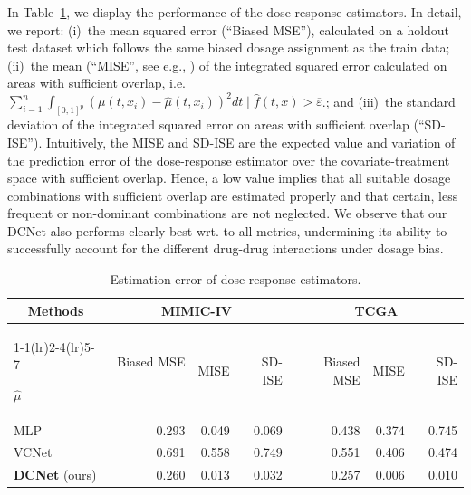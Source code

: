 In Table~\ref{tab:DRest}, we display the performance of the dose-response estimators. In detail, we report: (i)~the mean squared error (``Biased MSE''), calculated on a holdout test dataset which follows the same biased dosage assignment as the train data; (ii)~the mean (``MISE'', see e.g., \cite{Schwab.2020}) of the integrated squared error calculated on areas with sufficient overlap, i.e. $\sum_{i=1}^n\int_{[0, 1]^p}(\mu(t, x_i)-\hat{\mu}(t, x_i))^2dt \; | \; \hat{f}(t, x)>\overline{\varepsilon}$.; and (iii)~the standard deviation of the integrated squared error on areas with sufficient overlap (``SD-ISE''). Intuitively, the MISE and SD-ISE are the expected value and variation of the prediction error of the dose-response estimator over the covariate-treatment space with sufficient overlap. Hence, a low value implies that all suitable dosage combinations with sufficient overlap are estimated properly and that certain, less frequent or non-dominant combinations are not neglected. We observe that our DCNet also performs clearly best wrt. to all metrics, undermining its ability to successfully account for the different drug-drug interactions under dosage bias.

\begin{table}[h]
    \centering
    \scriptsize
    \begin{tabular}{l|rrr|rrr}
        \toprule
        
         \multicolumn{1}{c}{\textbf{Methods}} & \multicolumn{3}{c}{\textbf{MIMIC-IV}} & \multicolumn{3}{c}{\textbf{TCGA}} \\
         \cmidrule(lr){1-1}\cmidrule(lr){2-4}\cmidrule(lr){5-7}
        
        $\hat{\mu}$  & Biased MSE \ &   MISE   & SD-ISE &  Biased MSE &   MISE  & SD-ISE \\
        \midrule
        MLP   &   0.293 &           0.049 &    0.069 &  0.438 &       0.374 & 0.745\\
        VCNet &     0.691  &           0.558 &     0.749 &   0.551 &    0.406 & 0.474\\
        \textbf{DCNet} (ours) &         0.260  &           0.013 &  0.032  &    0.257 &         0.006  & 0.010 \\
        \midrule
        \end{tabular}
        
        \vskip 0.2cm   
        \caption{Estimation error of dose-response estimators. }
        \label{tab:DRest}
\end{table}

